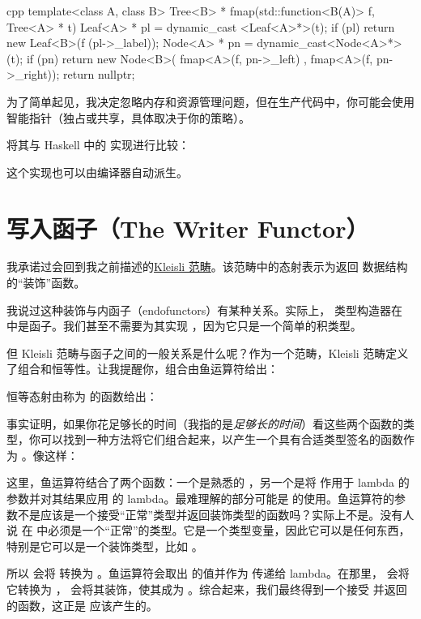 \begin{snip}{cpp}
  template<class A, class B>
  Tree<B> * fmap(std::function<B(A)> f, Tree<A> * t) {
    Leaf<A> * pl = dynamic_cast <Leaf<A>*>(t);
    if (pl)
    return new Leaf<B>(f (pl->_label));
    Node<A> * pn = dynamic_cast<Node<A>*>(t);
    if (pn)
    return new Node<B>( fmap<A>(f, pn->_left)
    , fmap<A>(f, pn->_right));
    return nullptr;
  }
\end{snip}
为了简单起见，我决定忽略内存和资源管理问题，但在生产代码中，你可能会使用智能指针（独占或共享，具体取决于你的策略）。

将其与 Haskell 中的  实现进行比较：

这个实现也可以由编译器自动派生。

\section{写入函子（The Writer Functor）}

我承诺过会回到我之前描述的\hyperref[kleisli-categories]{Kleisli 范畴}。该范畴中的态射表示为返回  数据结构的“装饰”函数。

我说过这种装饰与内函子（endofunctors）有某种关系。实际上， 类型构造器在  中是函子。我们甚至不需要为其实现 ，因为它只是一个简单的积类型。

但 Kleisli 范畴与函子之间的一般关系是什么呢？作为一个范畴，Kleisli 范畴定义了组合和恒等性。让我提醒你，组合由鱼运算符给出：

恒等态射由称为  的函数给出：

事实证明，如果你花足够长的时间（我指的是\emph{足够长的时间}）看这些两个函数的类型，你可以找到一种方法将它们组合起来，以产生一个具有合适类型签名的函数作为 。像这样：

这里，鱼运算符结合了两个函数：一个是熟悉的 ，另一个是将  作用于 lambda 的参数并对其结果应用  的 lambda。最难理解的部分可能是  的使用。鱼运算符的参数不是应该是一个接受“正常”类型并返回装饰类型的函数吗？实际上不是。没有人说  在  中必须是一个“正常”的类型。它是一个类型变量，因此它可以是任何东西，特别是它可以是一个装饰类型，比如 。

所以  会将  转换为 。鱼运算符会取出  的值并作为  传递给 lambda。在那里， 会将它转换为 ， 会将其装饰，使其成为 。综合起来，我们最终得到一个接受  并返回  的函数，这正是  应该产生的。

